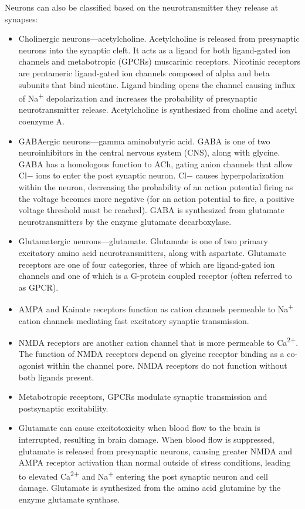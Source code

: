 Neurons can also be classified based on the neurotransmitter they release at synapses:

\begin{itemize}
\tightlist
\item
  Cholinergic neurons---acetylcholine. Acetylcholine is released from presynaptic neurons into the synaptic cleft. It acts as a ligand for both ligand-gated ion channels and metabotropic (GPCRs) muscarinic receptors. Nicotinic receptors are pentameric ligand-gated ion channels composed of alpha and beta subunits that bind nicotine. Ligand binding opens the channel causing influx of Na\textsuperscript{+} depolarization and increases the probability of presynaptic neurotransmitter release. Acetylcholine is synthesized from choline and acetyl coenzyme A.
\item
  GABAergic neurons---gamma aminobutyric acid. GABA is one of two neuroinhibitors in the central nervous system (CNS), along with glycine. GABA has a homologous function to ACh, gating anion channels that allow Cl− ions to enter the post synaptic neuron. Cl− causes hyperpolarization within the neuron, decreasing the probability of an action potential firing as the voltage becomes more negative (for an action potential to fire, a positive voltage threshold must be reached). GABA is synthesized from glutamate neurotransmitters by the enzyme glutamate decarboxylase.
\item
  Glutamatergic neurons---glutamate. Glutamate is one of two primary excitatory amino acid neurotransmitters, along with aspartate. Glutamate receptors are one of four categories, three of which are ligand-gated ion channels and one of which is a G-protein coupled receptor (often referred to as GPCR).
\item
  AMPA and Kainate receptors function as cation channels permeable to Na\textsuperscript{+} cation channels mediating fast excitatory synaptic transmission.
\item
  NMDA receptors are another cation channel that is more permeable to Ca\textsuperscript{2+}. The function of NMDA receptors depend on glycine receptor binding as a co-agonist within the channel pore. NMDA receptors do not function without both ligands present.
\item
  Metabotropic receptors, GPCRs modulate synaptic transmission and postsynaptic excitability.
\item
  Glutamate can cause excitotoxicity when blood flow to the brain is interrupted, resulting in brain damage. When blood flow is suppressed, glutamate is released from presynaptic neurons, causing greater NMDA and AMPA receptor activation than normal outside of stress conditions, leading to elevated Ca\textsuperscript{2+} and Na\textsuperscript{+} entering the post synaptic neuron and cell damage. Glutamate is synthesized from the amino acid glutamine by the enzyme glutamate synthase.

\end{itemize}
